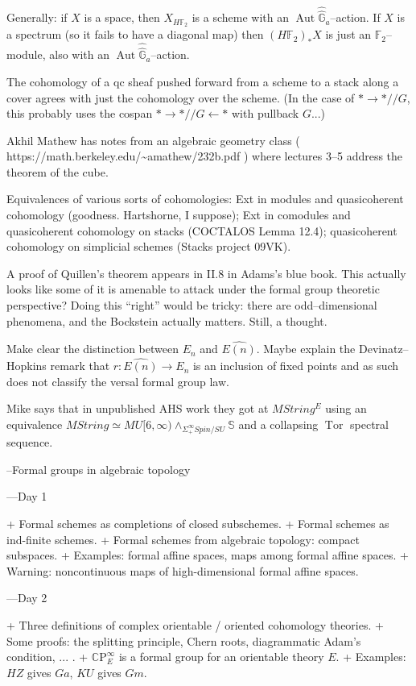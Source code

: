 \documentclass[12pt]{book}
\renewcommand{\S}{\mathbb S}
\newcommand{\F}{\mathbb F}
\newcommand{\G}{\widehat{\mathbb G}}
\newcommand{\C}{\mathbb{C}}
\newcommand{\CP}{\C\mathrm P}
\newcommand{\<}{\langle}
\renewcommand{\>}{\rangle}
\newcommand{\sm}{\wedge}
\newcommand{\Susp}{\Sigma}
\newcommand{\mmod}{/\!\!/}
\newcommand{\Spin}{\mathit{Spin}}
\newcommand{\String}{\mathit{String}}
\DeclareMathOperator{\Aut}{Aut}
\DeclareMathOperator{\Tor}{Tor}
\numberwithin{equation}{section}
\theoremstyle{plain}
\theoremstyle{definition}
\theoremstyle{remark}
\begin{document}
Generally: if $X$ is a space, then $X_{H\F_2}$ is a scheme with an $\Aut \widehat \G_a$--action. If $X$ is a spectrum (so it fails to have a diagonal map) then $(H\F_2)_* X$ is just an $\F_2$--module, also with an $\Aut \widehat \G_a$--action.

The cohomology of a qc sheaf pushed forward from a scheme to a stack along a cover agrees with just the cohomology over the scheme. (In the case of $* \to * \mmod G$, this probably uses the cospan $* \to * \mmod G \leftarrow *$ with pullback $G$...)

Akhil Mathew has notes from an algebraic geometry class ( https://math.berkeley.edu/{\textasciitilde}amathew/232b.pdf ) where lectures 3--5 address the theorem of the cube.

Equivalences of various sorts of cohomologies: Ext in modules and quasicoherent cohomology (goodness. Hartshorne, I suppose); Ext in comodules and quasicoherent cohomology on stacks (COCTALOS Lemma 12.4); quasicoherent cohomology on simplicial schemes (Stacks project 09VK).

A proof of Quillen's theorem appears in II.8 in Adams's blue book. This actually looks like some of it is amenable to attack under the formal group theoretic perspective? Doing this ``right'' would be tricky: there are odd--dimensional phenomena, and the Bockstein actually matters. Still, a thought.

Make clear the distinction between $E_n$ and $\widehat{E(n)}$. Maybe explain the Devinatz--Hopkins remark that $r: \widehat{E(n)} \to E_n$ is an inclusion of fixed points and as such does not classify the versal formal group law.

Mike says that in unpublished AHS work they got at $MString^E$ using an equivalence $M\String \simeq MU[6, \infty) \sm_{\Susp^\infty_+ \Spin/SU} \S$ and a collapsing $\Tor$ spectral sequence.

--Formal groups in algebraic topology

---Day 1

+ Formal schemes as completions of closed subschemes.
+ Formal schemes as ind-finite schemes.
+ Formal schemes from algebraic topology: compact subspaces.
+ Examples: formal affine spaces, maps among formal affine spaces.
+ Warning: noncontinuous maps of high-dimensional formal affine spaces.

---Day 2

+ Three definitions of complex orientable / oriented cohomology theories.
+ Some proofs: the splitting principle, Chern roots, diagrammatic Adam's condition, ... .
+ $\CP^\infty_E$ is a formal group for an orientable theory $E$.
+ Examples: $HZ$ gives $Ga$, $KU$ gives $Gm$.
\end{document}
